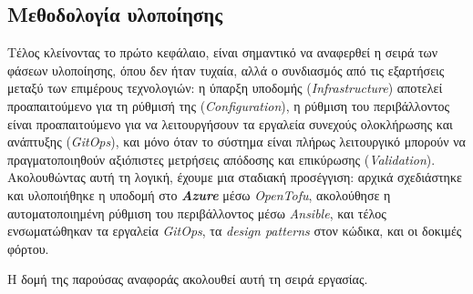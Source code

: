 \subsection{Μεθοδολογία υλοποίησης}

Τέλος κλείνοντας το πρώτο κεφάλαιο, είναι σημαντικό να αναφερθεί η σειρά των φάσεων υλοποίησης, όπου δεν ήταν τυχαία, αλλά ο συνδιασμός από τις εξαρτήσεις μεταξύ των επιμέρους τεχνολογιών: η ύπαρξη υποδομής (\textit{Infrastructure}) αποτελεί προαπαιτούμενο για τη ρύθμισή της (\textit{Configuration}), η ρύθμιση του περιβάλλοντος είναι προαπαιτούμενο για να λειτουργήσουν τα εργαλεία συνεχούς ολοκλήρωσης και ανάπτυξης (\textit{GitOps}), και μόνο όταν το σύστημα είναι πλήρως λειτουργικό μπορούν να πραγματοποιηθούν αξιόπιστες μετρήσεις απόδοσης και επικύρωσης (\textit{Validation}). Ακολουθώντας αυτή τη λογική, έχουμε μια σταδιακή προσέγγιση: αρχικά σχεδιάστηκε και υλοποιήθηκε η υποδομή στο \textcolor{HUAblue}{\textbf{\textit{Azure}}} μέσω \textit{OpenTofu}, ακολούθησε η αυτοματοποιημένη ρύθμιση του περιβάλλοντος μέσω \textit{Ansible}, και τέλος ενσωματώθηκαν τα εργαλεία \textit{GitOps}, τα \textit{design patterns} στον κώδικα, και οι δοκιμές φόρτου.

Η δομή της παρούσας αναφοράς ακολουθεί αυτή τη σειρά εργασίας.

\begin{center}
\end{center}
